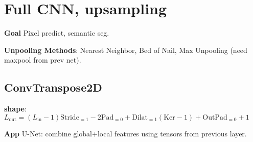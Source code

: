 \section{Full CNN, upsampling}
\textbf{Goal} Pixel predict, semantic seg.

\textbf{Unpooling Methods}: Nearest Neighbor, Bed of Nail, Max Unpooling (need maxpool from prev net).

\subsection*{ConvTranspose2D}
\textbf{shape}: \(L_{\text{out}} = (L_{\text{in}} - 1)\text{Stride}_{=1} - 2  \text{Pad}_{=0} + \text{Dilat}_{=1}(\text{Ker} - 1) + \text{OutPad}_{=0} + 1\)

\textbf{App} U-Net: combine global+local features using tensors from previous layer.

